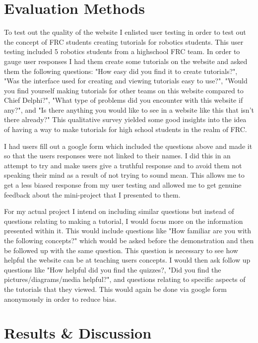 \documentclass[10pt,twocolumn]{article}
\begin{document}
\section{Evaluation Methods}

To test out the quality of the website I enlisted user testing in order to test out the concept of FRC students creating tutorials for robotics students. This user testing included 5 robotics students from a highschool FRC team. In order to gauge user responses I had them create some tutorials on the website and asked them the following questions: "How easy did you find it to create tutorials?", "Was the interface used for creating and viewing tutorials easy to use?", "Would you find yourself making tutorials for other teams on this website compared to Chief Delphi?", "What type of problems did you encounter with this website if any?", and "Is there anything you would like to see in a website like this that isn't there already?" This qualitative survey yielded some good insights into the idea of having a way to make tutorials for high school students in the realm of FRC. 

I had users fill out a google form which included the questions above and made it so that the users responses were not linked to their names. I did this in an attempt to try and make users give a truthful response and to avoid them not speaking their mind as a result of not trying to sound mean. This allows me to get a less biased response from my user testing and allowed me to get genuine feedback about the mini-project that I presented to them.

For my actual project I intend on including similar questions but instead of questions relating to making a tutorial, I would focus more on the information presented within it. This would include questions like "How familiar are you with the following concepts?" which would be asked before the demonstration and then be followed up with the same question. This question is necessary to see how helpful the website can be at teaching users concepts. I would then ask follow up questions like "How helpful did you find the quizzes?, "Did you find the pictures/diagrams/media helpful?", and questions relating to specific aspects of the tutorials that they viewed. This would again be done via google form anonymously in order to reduce bias.


\section{Results \& Discussion}
\end{document}
